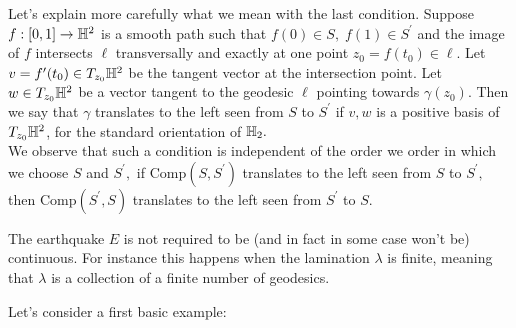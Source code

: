 Let's explain more carefully what we mean with the last condition. Suppose $f:[0,1]\to\mathbb{H}^2$ is a smooth path such that $f(0)\in S,\;f(1)\in S^{\prime}$ and the image of $f$ intersects $\ell$ transversally and exactly at one point $z_0=f(t_0)\in\ell.$ Let $v=f^{\prime}(t_0)\in T_{z_0}\mathbb{H}^2$ be the tangent vector at the intersection point. Let $w\in T_{z_0}\mathbb{H}^2$ be a vector tangent to the geodesic $\ell$ pointing towards $\gamma(z_0).$ Then we say that $\gamma$ translates to the left seen from $S$ to $S^{\prime} $ if $v,w$ is a positive basis of $T_{z_0}\mathbb{H}^2$, for the standard orientation of $\mathbb{H}_2.$\\
We observe that such a condition is independent of the order we order in which we choose $S$ and $S^{\prime},$  if $\text{Comp}(S,S^{\prime})$ translates to the left seen from $S$ to $S^{\prime},$ then $\text{Comp}(S^{\prime} ,S)$ translates to the left seen from $S^{\prime} $ to $S.$ 


\begin{observation} The earthquake $E$ is not required to be (and in fact in some case won't be) continuous. For instance this happens when the lamination $\lambda$ is finite, meaning that $\lambda$ is a collection of a finite number of geodesics. 
\end{observation}

Let's consider a first basic example: 

